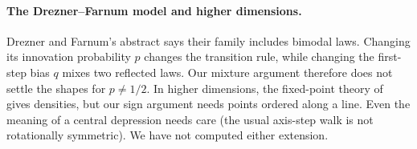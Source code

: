\paragraph{The Drezner--Farnum model and higher dimensions.}
Drezner and Farnum's abstract says their family includes bimodal laws.
Changing its innovation probability $p$ changes the transition rule,
while changing the first-step bias $q$ mixes two reflected laws.
Our mixture argument therefore does not settle the shapes for $p\ne1/2$.
In higher dimensions, the fixed-point theory of~\cite{glr2026} gives
densities, but our sign argument needs points ordered along a line.
Even the meaning of a central depression needs care
(the usual axis-step walk is not rotationally symmetric).
We have not computed either extension.
